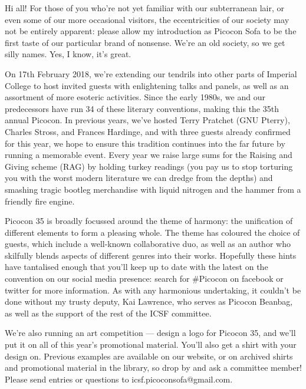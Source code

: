 Hi all! For those of you who’re not yet familiar with our subterranean lair, or even some of our more occasional visitors, the eccentricities of our society may not be entirely apparent: please allow my introduction as Picocon Sofa to be the first taste of our particular brand of nonsense. We’re an old society, so we get silly names. Yes, I know, it’s great.

On 17th February 2018, we’re extending our tendrils into other parts of Imperial College to host invited guests with enlightening talks and panels, as well as an assortment of more esoteric activities. Since the early 1980s, we and our predecessors have run 34 of these literary conventions, making this the 35th annual Picocon. In previous years, we’ve hosted Terry Pratchet (GNU Pterry), Charles Stross, and Frances Hardinge, and with three guests already confirmed for this year, we hope to ensure this tradition continues into the far future by running a memorable event. Every year we raise large sums for the Raising and Giving scheme (RAG) by holding turkey readings (you pay us to stop torturing you with the worst modern literature we can dredge from the depths) and smashing tragic bootleg merchandise with liquid nitrogen and the hammer from a friendly fire engine.

Picocon 35 is broadly focussed around the theme of harmony: the unification of different elements to form a pleasing whole. The theme has coloured the choice of guests, which include a well-known collaborative duo, as well as an author who skilfully blends aspects of different genres into their works. Hopefully these hints have tantalised enough that you’ll keep up to date with the latest on the convention on our social media presence: search for \#Picocon on facebook or twitter for more information. As with any harmonious undertaking, it couldn’t be done without my trusty deputy, Kai Lawrence, who serves as Picocon Beanbag, as well as the support of the rest of the ICSF committee.

We’re also running an art competition --- design a logo for Picocon 35, and we’ll put it on all of this year’s promotional material. You’ll also get a shirt with your design on. Previous examples are available on our website, or on archived shirts and promotional material in the library, so drop by and ask a committee member! Please send entries or questions to icsf.picoconsofa@gmail.com.